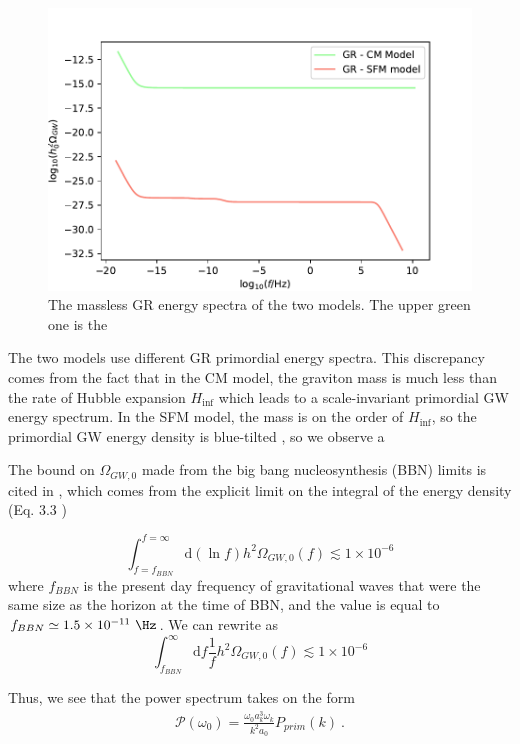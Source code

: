 \begin{figure}[h]
    \centering
    \includegraphics[width=\linewidth]{fig/fig5.pdf} 
    \caption{The massless GR energy spectra of the two models. The upper green one is the  }
\end{figure}
The two models use different GR primordial energy spectra. This discrepancy comes from the fact that in the CM model, the graviton mass is much less than the rate of Hubble expansion $H_{\inf}$ which leads to a scale-invariant primordial GW energy spectrum. In the SFM model, the mass is on the order of $H_{\inf}$, so the primordial GW energy density is blue-tilted \cite{Fujita:2018}, so we observe a  

The bound on $\Omega_{GW,0}$ made from the big bang nucleosynthesis (BBN) limits is cited in \cite{Fujita:2018}, which comes from the explicit limit on the integral of the energy density (Eq. 3.3 \cite{Tanin:2021}) 

\begin{equation} \label{eq:1}
    \int_{f = f_{BBN}}^{f = \infty}\mbox{d}(\ln{f}) h^2\Omega_{GW,0}(f) \lesssim 1\times 10^{-6}
\end{equation} 
where $f_{BBN}$ is the present day frequency of gravitational waves that were the same size as the horizon at the time of BBN, and the value is equal to $f_{BBN} \simeq 1.5\times 10^{-11} \ \Hz$. We can rewrite  as 
\begin{equation} \label{eq:11}
    \int_{f_{BBN}}^{\infty}\mbox{d}f \frac{1}{f} h^2\Omega_{GW,0}(f) \lesssim 1\times 10^{-6}
\end{equation} 


Thus, we see that the power spectrum takes on the form 
\begin{equation}\label{eqn:18}
    \begin{multlined}
    \mathcal{P}(\omega_0)  = \frac{\omega_0 a_k^3 \omega_k}{k^2 a_0} P_{prim}(k)\ .
    \end{multlined}
\end{equation}